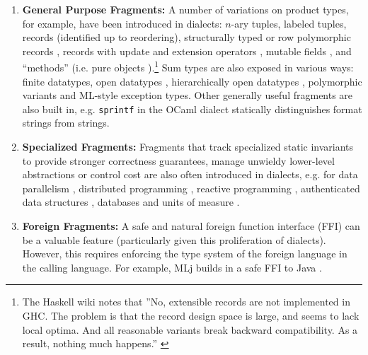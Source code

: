 \documentclass[9pt,preprint]{sigplanconf}
\newcommand{\compresslist}{
  \vspace{-1em}
  \setlength{\itemsep}{1pt}
  \setlength{\parskip}{0pt}
  \setlength{\parsep}{0pt}
}
\begin{document}
\begin{enumerate}
\compresslist
\vspace{5px}
\item 
\textbf{General Purpose Fragments:} 
A number of variations on product types, for example, have been introduced in dialects: 
$n$-ary tuples, 
labeled tuples, 
records (identified up to reordering), 
structurally typed or row polymorphic records \cite{Cardelli:1984:SMI:1096.1098}, 
records with update and extension operators \cite{ocaml-manual}, 
mutable fields \cite{ocaml-manual}, 
and 
``methods'' (i.e. pure objects \cite{conf/oopsla/Aldrich13, TSLs}).\footnote{The Haskell wiki notes that ''No, extensible records are not implemented in GHC. The problem is that the record design space is large, and seems to lack local optima. And all reasonable variants break backward compatibility. As a result, nothing much happens.'' \cite{GHCFAQ}} 
 Sum types are also exposed in various ways: 
finite datatypes, 
open datatypes \cite{conf/ppdp/LohH06}, 
hierarchically open datatypes \cite{journals/toplas/MillsteinBC04}, 
polymorphic variants \cite{ocaml-manual} and 
ML-style exception types. Other generally useful fragments are also built in, e.g. \verb|sprintf| in the OCaml dialect statically distinguishes format strings from strings.

\item
\textbf{Specialized Fragments:} Fragments that track specialized static invariants to provide stronger correctness guarantees, manage unwieldy lower-level abstractions or control cost are also often introduced in dialects, e.g. for data parallelism  \cite{chakravarty2007data}, distributed programming \cite{Murphy:2007:TDP:1793574.1793585}, reactive programming \cite{mandel2005reactiveml}, authenticated data structures \cite{Miller:2014:ADS:2535838.2535851}, databases \cite{Ohori:2011:MSM:2034773.2034815} and units of measure \cite{conf/cefp/Kennedy09}.%

\item
\textbf{Foreign Fragments:} A safe and natural foreign function interface (FFI) can be a valuable feature (particularly given this proliferation of dialects). However, this requires enforcing the type system of the foreign language in the calling language. %
For example, MLj builds in a safe FFI to Java \cite{Benton:1999:IWW:317636.317791}.
\end{enumerate}
\vspace{-5px}
\end{document}
